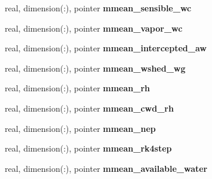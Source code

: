\begin{DoxyCompactItemize}
\item 
\hypertarget{structed__state__vars_1_1edtype_a94c4facd241291f4f6988742b005ab41}{
real, dimension(:), pointer {\bfseries mmean\_\-sensible\_\-wc}}
\label{structed__state__vars_1_1edtype_a94c4facd241291f4f6988742b005ab41}

\item 
\hypertarget{structed__state__vars_1_1edtype_a7bc303b33b05fe5e7c7e0c99934c24fc}{
real, dimension(:), pointer {\bfseries mmean\_\-vapor\_\-wc}}
\label{structed__state__vars_1_1edtype_a7bc303b33b05fe5e7c7e0c99934c24fc}

\item 
\hypertarget{structed__state__vars_1_1edtype_a48d861a325778f41872d1d531aa3750f}{
real, dimension(:), pointer {\bfseries mmean\_\-intercepted\_\-aw}}
\label{structed__state__vars_1_1edtype_a48d861a325778f41872d1d531aa3750f}

\item 
\hypertarget{structed__state__vars_1_1edtype_ab6a8bf72fddefdf0de0792fa1ce3cf9a}{
real, dimension(:), pointer {\bfseries mmean\_\-wshed\_\-wg}}
\label{structed__state__vars_1_1edtype_ab6a8bf72fddefdf0de0792fa1ce3cf9a}

\item 
\hypertarget{structed__state__vars_1_1edtype_a09caa8ddfb5abed24325393cc14fc25a}{
real, dimension(:), pointer {\bfseries mmean\_\-rh}}
\label{structed__state__vars_1_1edtype_a09caa8ddfb5abed24325393cc14fc25a}

\item 
\hypertarget{structed__state__vars_1_1edtype_a1d2275cbdde0a9af02f5a1b7c7c32a74}{
real, dimension(:), pointer {\bfseries mmean\_\-cwd\_\-rh}}
\label{structed__state__vars_1_1edtype_a1d2275cbdde0a9af02f5a1b7c7c32a74}

\item 
\hypertarget{structed__state__vars_1_1edtype_a3d97a588615d109e6d6203f7d946fd37}{
real, dimension(:), pointer {\bfseries mmean\_\-nep}}
\label{structed__state__vars_1_1edtype_a3d97a588615d109e6d6203f7d946fd37}

\item 
\hypertarget{structed__state__vars_1_1edtype_a9508616b12d018f9af438e7481061140}{
real, dimension(:), pointer {\bfseries mmean\_\-rk4step}}
\label{structed__state__vars_1_1edtype_a9508616b12d018f9af438e7481061140}

\item 
\hypertarget{structed__state__vars_1_1edtype_a115854a543a4d9fbc98b5e237d85035a}{
real, dimension(:), pointer {\bfseries mmean\_\-available\_\-water}}
\label{structed__state__vars_1_1edtype_a115854a543a4d9fbc98b5e237d85035a}


\end{DoxyCompactItemize}
